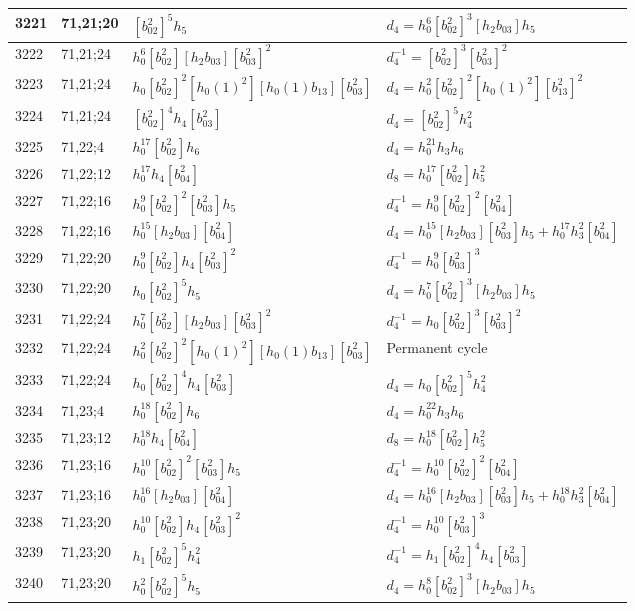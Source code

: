 \documentclass{article}
\begin{document}
\begin{longtable}{|l|l|>{\raggedright\arraybackslash}p{6cm}|>{\raggedright\arraybackslash}p{6cm}|}
3221 & 71,21;20 & $[b_{02}^2]^5h_5$ &$d_{4}=h_0^6[b_{02}^2]^3[h_2b_{03}]h_5$\\
\hline
3222 & 71,21;24 & $h_0^6[b_{02}^2][h_2b_{03}][b_{03}^2]^2$ & $d_{4}^{-1}=[b_{02}^2]^3[b_{03}^2]^2$\\
3223 & 71,21;24 & $h_0[b_{02}^2]^2[h_0(1)^2][h_0(1)b_{13}][b_{03}^2]$ &$d_{4}=h_0^2[b_{02}^2]^2[h_0(1)^2][b_{13}^2]^2$\\
3224 & 71,21;24 & $[b_{02}^2]^4h_4[b_{03}^2]$ &$d_{4}=[b_{02}^2]^5h_4^2$\\
\hline
3225 & 71,22;4 & $h_0^{17}[b_{02}^2]h_6$ &$d_{4}=h_0^{21}h_3h_6$\\
\hline
3226 & 71,22;12 & $h_0^{17}h_4[b_{04}^2]$ &$d_{8}=h_0^{17}[b_{02}^2]h_5^2$\\
\hline
3227 & 71,22;16 & $h_0^9[b_{02}^2]^2[b_{03}^2]h_5$ & $d_{4}^{-1}=h_0^9[b_{02}^2]^2[b_{04}^2]$\\
3228 & 71,22;16 & $h_0^{15}[h_2b_{03}][b_{04}^2]$ &$d_{4}=h_0^{15}[h_2b_{03}][b_{03}^2]h_5 + h_0^{17}h_3^2[b_{04}^2]$\\
\hline
3229 & 71,22;20 & $h_0^9[b_{02}^2]h_4[b_{03}^2]^2$ & $d_{4}^{-1}=h_0^9[b_{03}^2]^3$\\
3230 & 71,22;20 & $h_0[b_{02}^2]^5h_5$ &$d_{4}=h_0^7[b_{02}^2]^3[h_2b_{03}]h_5$\\
\hline
3231 & 71,22;24 & $h_0^7[b_{02}^2][h_2b_{03}][b_{03}^2]^2$ & $d_{4}^{-1}=h_0[b_{02}^2]^3[b_{03}^2]^2$\\
3232 & 71,22;24 & $h_0^2[b_{02}^2]^2[h_0(1)^2][h_0(1)b_{13}][b_{03}^2]$ & Permanent cycle\\
3233 & 71,22;24 & $h_0[b_{02}^2]^4h_4[b_{03}^2]$ &$d_{4}=h_0[b_{02}^2]^5h_4^2$\\
\hline
3234 & 71,23;4 & $h_0^{18}[b_{02}^2]h_6$ &$d_{4}=h_0^{22}h_3h_6$\\
\hline
3235 & 71,23;12 & $h_0^{18}h_4[b_{04}^2]$ &$d_{8}=h_0^{18}[b_{02}^2]h_5^2$\\
\hline
3236 & 71,23;16 & $h_0^{10}[b_{02}^2]^2[b_{03}^2]h_5$ & $d_{4}^{-1}=h_0^{10}[b_{02}^2]^2[b_{04}^2]$\\
3237 & 71,23;16 & $h_0^{16}[h_2b_{03}][b_{04}^2]$ &$d_{4}=h_0^{16}[h_2b_{03}][b_{03}^2]h_5 + h_0^{18}h_3^2[b_{04}^2]$\\
\hline
3238 & 71,23;20 & $h_0^{10}[b_{02}^2]h_4[b_{03}^2]^2$ & $d_{4}^{-1}=h_0^{10}[b_{03}^2]^3$\\
3239 & 71,23;20 & $h_1[b_{02}^2]^5h_4^2$ & $d_{4}^{-1}=h_1[b_{02}^2]^4h_4[b_{03}^2]$\\
3240 & 71,23;20 & $h_0^2[b_{02}^2]^5h_5$ &$d_{4}=h_0^8[b_{02}^2]^3[h_2b_{03}]h_5$\\

\end{longtable}
\end{document}

